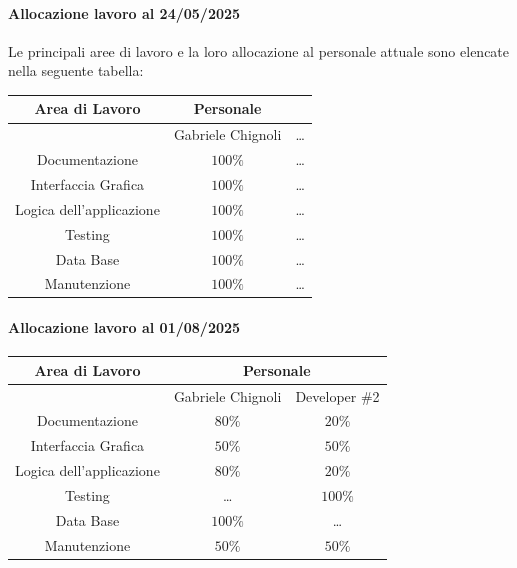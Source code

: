 \documentclass{article}
\begin{document}
\paragraph{Allocazione lavoro al 24/05/2025}
Le principali aree di lavoro e la loro allocazione al personale attuale sono elencate nella seguente tabella:
\begin{center}
    \begin{longtable}{ccc}
    \toprule
         \textbf{Area di Lavoro} & \textbf{Personale}  & \\
         \midrule
         & Gabriele Chignoli & \dots \\
    \midrule
         Documentazione & $100\%$  & \dots \\
         Interfaccia Grafica & $100\%$ & \dots  \\
         Logica dell'applicazione & $100\%$ & \dots \\
         Testing & $100\%$  & \dots \\
         Data Base & $100\%$  & \dots \\
         Manutenzione & $100\%$ & \dots  \\
    \bottomrule
    \end{longtable}
\end{center}

\paragraph{Allocazione lavoro al 01/08/2025}
\begin{center}
    \begin{longtable}{ccc}
    \toprule
         \textbf{Area di Lavoro} & \multicolumn{2}{c}{\textbf{Personale}} \\
         \midrule
         & Gabriele Chignoli & Developer \#2 \\
    \midrule
         Documentazione & $80\%$  & $20\%$ \\
         Interfaccia Grafica & $50\%$ & $50\%$  \\
         Logica dell'applicazione & $80\%$ &  $20\%$\\
         Testing & \dots  & $100\%$ \\
         Data Base & $100\%$  & \dots \\
         Manutenzione & $50\%$ & $50\%$  \\
    \bottomrule
    \end{longtable}
\end{center}
\end{document}
